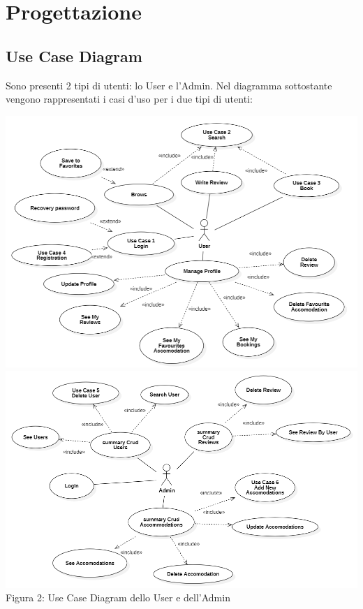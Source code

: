 \documentclass[10pt]{article}
\begin{document}
\section{Progettazione}
\subsection{Use Case Diagram}

Sono presenti 2 tipi di utenti: lo User e l'Admin. Nel diagramma sottostante vengono rappresentati i casi d'uso per i due tipi di utenti: 
\begin{center}
\hspace*{-1cm}
\includegraphics[scale=0.5]{usecases/ClientUseCase}
\hspace*{-1cm}
\includegraphics[scale=0.65]{usecases/AdminUseCase}\\
Figura 2: Use Case Diagram dello User e dell'Admin
\end{center}
\label{usecase}
\end{document}
